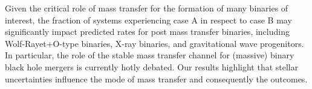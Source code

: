\documentclass[twocolumn]{aastex63}
\begin{document}
Given the critical role of mass transfer for the formation of many
binaries of interest, the fraction of systems experiencing case A in
respect to case B may significantly impact predicted rates for post mass
transfer binaries, including Wolf-Rayet+O-type binaries, X-ray
binaries, and gravitational wave progenitors. In
particular, the role of the stable mass transfer channel
\citep[e.g.,][]{marchant:21, vanson:22} for (massive) binary black
hole mergers is currently hotly debated. Our results highlight that
stellar uncertainties influence the mode of mass transfer and
consequently the outcomes.




\end{document}
